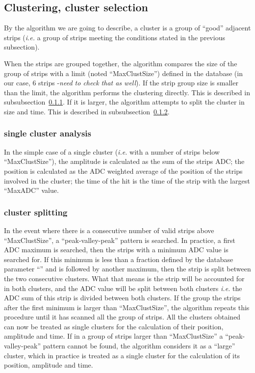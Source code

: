 \subsection{Clustering, cluster selection}
\label{cluster_algo}

By the algorithm we are going to describe, a cluster is a group of ``good'' adjacent strips ({\it i.e.} a group of strips meeting the conditions stated in the previous subsection).

When the strips are grouped together, the algorithm compares the size of the group of strips
with a limit (noted ``MaxClustSize'') defined in the database (in our case, 6 strips -{\em need to check that as well}).
If the strip group size is smaller than the limit, the algorithm performs the clustering directly. This is described in subsubsection~\ref{single_cluster}.
If it is larger, the algorithm attempts to split the cluster in size and time. This is described in subsubsection~\ref{cluster_split}.

\subsubsection{single cluster analysis}
\label{single_cluster}
In the simple case of a single cluster ({\it i.e.} with a number of strips below ``MaxClustSize''), the amplitude is calculated as the sum of the strips ADC; the position is calculated as the ADC weighted average of the position of the strips involved in the cluster; the time of the hit is the time of the strip with the largest ``MaxADC'' value.

\subsubsection{cluster splitting}
\label{cluster_split}
In the event where there is a consecutive number of valid strips above ``MaxClustSize'', a ``peak-valley-peak'' pattern is searched. In practice, a first ADC maximum is searched, then the strips with a minimum ADC value is searched for.
If this minimum is less than a fraction defined by the database parameter ``'' and is followed by another maximum, then the strip is split between the two consecutive clusters.
What that means is the strip will be accounted for in both clusters, and the ADC value will be split between both clusters {\it i.e.} the ADC sum of this strip is divided between both clusters.
If the group the strips after the first minimum is larger than ``MaxClustSize'', the algorithm repeats this procedure until it has scanned all the group of strips.
All the clusters obtained can now be treated as single clusters for the calculation of their position, amplitude and time.
If in a group of strips larger than ``MaxClustSize'' a ``peak-valley-peak'' pattern cannot be found, the algorithm considers it as a ``large'' cluster, which in practice is treated as a single cluster for the calculation of its position, amplitude and time.


